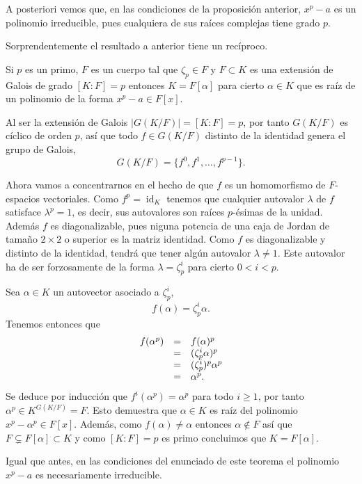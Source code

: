 
A posteriori vemos que, en las condiciones de la proposición anterior,
\(x^p-a\) es un polinomio irreducible, pues cualquiera de sus raíces
complejas tiene grado \(p\). 

Sorprendentemente el resultado a anterior tiene un recíproco.


Si \(p\) es un primo, \(F\) es un cuerpo tal que \(\zeta_p\in F\) y
\(F\subset K\) es una extensión de Galois de grado \([K:F]=p\) entonces
\(K=F[\alpha]\) para cierto \(\alpha\in K\) que es raíz de un polinomio
de la forma \(x^p-a\in F[x]\). 


Al ser la extensión de Galois \(|G(K/F)|=[K:F]=p\), por tanto \(G(K/F)\)
es cíclico de orden \(p\), así que todo \(f\in G(K/F)\) distinto de la
identidad genera el grupo de Galois,
\[G(K/F)=\{f^0,f^1,\dots, f^{p-1}\}.\]

Ahora vamos a concentrarnos en el hecho de que \(f\) es un homomorfismo
de \(F\)-espacios vectoriales. Como \(f^p=\operatorname{id}_K\) tenemos
que cualquier autovalor \(\lambda\) de \(f\) satisface \(\lambda^p=1\),
es decir, sus autovalores son raíces \(p\)-ésimas de la unidad. Además
\(f\) es diagonalizable, pues niguna potencia de una caja de Jordan de
tamaño \(2\times 2\) o superior es la matriz identidad. Como \(f\) es
diagonalizable y distinto de la identidad, tendrá que tener algún
autovalor \(\lambda\neq 1\). Este autovalor ha de ser forzosamente de la
forma \(\lambda =\zeta_p^i\) para cierto \(0{<}i{<}p\).

Sea \(\alpha\in K\) un autovector asociado a \(\zeta_p^i\),
\[f(\alpha)=\zeta_p^i\alpha.\] Tenemos entonces que
\[\begin{array}{rcl}
f(\alpha^p)&=&f(\alpha)^p\cr
&=&(\zeta_p^i\alpha)^p\cr
&=&(\zeta_p^i)^p\alpha^p\cr
&=&\alpha^p.
\end{array}\] Se deduce por inducción que \(f^i(\alpha^p)=\alpha^p\)
para todo \(i\geq 1\), por tanto \(\alpha^p\in K^{G(K/F)}=F\). Esto
demuestra que \(\alpha\in K\) es raíz del polinomio
\(x^p-\alpha^p\in F[x]\). Además, como \(f(\alpha)\neq \alpha\) entonces
\(\alpha\notin F\) así que \(F\subsetneq F[\alpha]\subset K\) y como
\([K:F]=p\) es primo concluimos que \(K=F[\alpha]\). 

Igual que antes, en las condiciones del enunciado de este teorema el
polinomio \(x^p-a\) es necesariamente irreducible.

